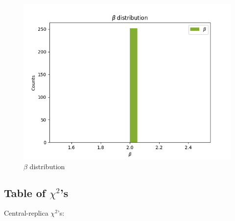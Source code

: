 \documentclass[
]{article}
\begin{document}
\begin{figure}
\centering
\includegraphics{pngplots/param13.png}
\caption{\(\beta\) distribution}
\end{figure}

\hypertarget{table-of-chi2s}{%
\subsection{\texorpdfstring{Table of
\(\chi^2\)'s}{Table of \textbackslash chi\^{}2's}}\label{table-of-chi2s}}

Central-replica \(\chi^2\)'s:
\end{document}
